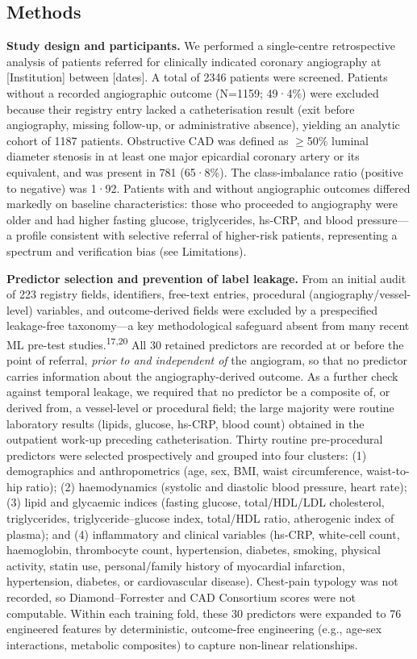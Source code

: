 \documentclass[english,11pt]{article}
\begin{document}
\subsection*{Methods}

\textbf{Study design and participants.}
We performed a single-centre retrospective analysis of patients referred for clinically indicated coronary angiography at [Institution] between [dates]. A total of 2346 patients were screened. Patients without a recorded angiographic outcome (N=1159; 49·4\%) were excluded because their registry entry lacked a catheterisation result (exit before angiography, missing follow-up, or administrative absence), yielding an analytic cohort of 1187 patients. Obstructive CAD was defined as $\geq$50\% luminal diameter stenosis in at least one major epicardial coronary artery or its equivalent, and was present in 781 (65·8\%). The class-imbalance ratio (positive to negative) was 1·92. Patients with and without angiographic outcomes differed markedly on baseline characteristics: those who proceeded to angiography were older and had higher fasting glucose, triglycerides, hs-CRP, and blood pressure---a profile consistent with selective referral of higher-risk patients, representing a spectrum and verification bias (see Limitations).

\textbf{Predictor selection and prevention of label leakage.}
From an initial audit of 223 registry fields, identifiers, free-text entries, procedural (angiography/vessel-level) variables, and outcome-derived fields were excluded by a prespecified leakage-free taxonomy---a key methodological safeguard absent from many recent ML pre-test studies.\textsuperscript{17,20} All 30 retained predictors are recorded at or before the point of referral, \emph{prior to and independent of} the angiogram, so that no predictor carries information about the angiography-derived outcome. As a further check against temporal leakage, we required that no predictor be a composite of, or derived from, a vessel-level or procedural field; the large majority were routine laboratory results (lipids, glucose, hs-CRP, blood count) obtained in the outpatient work-up preceding catheterisation. Thirty routine pre-procedural predictors were selected prospectively and grouped into four clusters: (1) demographics and anthropometrics (age, sex, BMI, waist circumference, waist-to-hip ratio); (2) haemodynamics (systolic and diastolic blood pressure, heart rate); (3) lipid and glycaemic indices (fasting glucose, total/HDL/LDL cholesterol, triglycerides, triglyceride--glucose index, total/HDL ratio, atherogenic index of plasma); and (4) inflammatory and clinical variables (hs-CRP, white-cell count, haemoglobin, thrombocyte count, hypertension, diabetes, smoking, physical activity, statin use, personal/family history of myocardial infarction, hypertension, diabetes, or cardiovascular disease). Chest-pain typology was not recorded, so Diamond--Forrester and CAD Consortium scores were not computable. Within each training fold, these 30 predictors were expanded to 76 engineered features by deterministic, outcome-free engineering (e.g., age-sex interactions, metabolic composites) to capture non-linear relationships.
\end{document}
